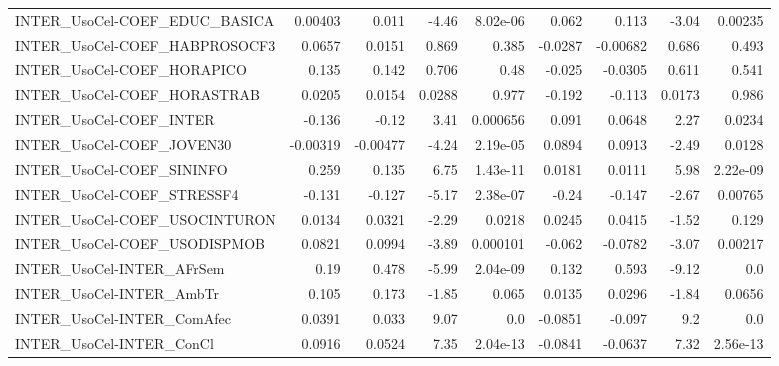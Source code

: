 \begin{tabular}{lrrrrrrrr}
INTER\_UsoCel-COEF\_EDUC\_BASICA          &     0.00403 &        0.011 &   -4.46 & 8.02e-06 &      0.062 &       0.113 &        -3.04 &       0.00235 \\
INTER\_UsoCel-COEF\_HABPROSOCF3          &      0.0657 &       0.0151 &   0.869 &    0.385 &    -0.0287 &    -0.00682 &        0.686 &         0.493 \\
INTER\_UsoCel-COEF\_HORAPICO             &       0.135 &        0.142 &   0.706 &     0.48 &     -0.025 &     -0.0305 &        0.611 &         0.541 \\
INTER\_UsoCel-COEF\_HORASTRAB            &      0.0205 &       0.0154 &  0.0288 &    0.977 &     -0.192 &      -0.113 &       0.0173 &         0.986 \\
INTER\_UsoCel-COEF\_INTER                &      -0.136 &        -0.12 &    3.41 & 0.000656 &      0.091 &      0.0648 &         2.27 &        0.0234 \\
INTER\_UsoCel-COEF\_JOVEN30              &    -0.00319 &     -0.00477 &   -4.24 & 2.19e-05 &     0.0894 &      0.0913 &        -2.49 &        0.0128 \\
INTER\_UsoCel-COEF\_SININFO              &       0.259 &        0.135 &    6.75 & 1.43e-11 &     0.0181 &      0.0111 &         5.98 &      2.22e-09 \\
INTER\_UsoCel-COEF\_STRESSF4             &      -0.131 &       -0.127 &   -5.17 & 2.38e-07 &      -0.24 &      -0.147 &        -2.67 &       0.00765 \\
INTER\_UsoCel-COEF\_USOCINTURON          &      0.0134 &       0.0321 &   -2.29 &   0.0218 &     0.0245 &      0.0415 &        -1.52 &         0.129 \\
INTER\_UsoCel-COEF\_USODISPMOB           &      0.0821 &       0.0994 &   -3.89 & 0.000101 &     -0.062 &     -0.0782 &        -3.07 &       0.00217 \\
INTER\_UsoCel-INTER\_AFrSem              &        0.19 &        0.478 &   -5.99 & 2.04e-09 &      0.132 &       0.593 &        -9.12 &           0.0 \\
INTER\_UsoCel-INTER\_AmbTr               &       0.105 &        0.173 &   -1.85 &    0.065 &     0.0135 &      0.0296 &        -1.84 &        0.0656 \\
INTER\_UsoCel-INTER\_ComAfec             &      0.0391 &        0.033 &    9.07 &      0.0 &    -0.0851 &      -0.097 &          9.2 &           0.0 \\
INTER\_UsoCel-INTER\_ConCl               &      0.0916 &       0.0524 &    7.35 & 2.04e-13 &    -0.0841 &     -0.0637 &         7.32 &      2.56e-13 \\

\end{tabular}
